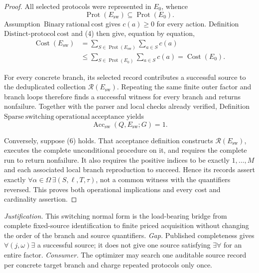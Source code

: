 \documentclass{article}
\begin{document}
\begin{proof}
All selected protocols were represented in \(E_0\), whence
\[
 \operatorname{Prot}(E_{\mathrm{sw}})
 \subseteq \operatorname{Prot}(E_0).
 \tag{4}
\]
Assumption~\(\mathrm{Binary\ rational\ cost}\) gives \(c(a)\geq0\) for every action.  Definition~\(\mathrm{Distinct\mbox{-}protocol\ cost}\) and (4) then give, equation by equation,
\[
\begin{aligned}
 \operatorname{Cost}(E_{\mathrm{sw}})
 &=\sum_{S\in\operatorname{Prot}(E_{\mathrm{sw}})}\sum_{a\in S}c(a)\\
 &\leq \sum_{S\in\operatorname{Prot}(E_0)}\sum_{a\in S}c(a)
 =\operatorname{Cost}(E_0).
\end{aligned}
\tag{5}
\]

For every concrete branch, its selected record contributes a successful source to the deduplicated collection \(\mathcal R(E_{\mathrm{sw}})\).  Repeating the same finite outer factor and branch loops therefore finds a successful witness for every branch and returns nonfailure.  Together with the parser and local checks already verified, Definition~\(\mathrm{Sparse\ switching\ operational\ acceptance}\) yields
\[
 \operatorname{Acc}_{\mathrm{sw}}(Q,E_{\mathrm{sw}};G)=1.
 \tag{6}
\]

Conversely, suppose (6) holds.  That acceptance definition constructs \(\mathcal R(E_{\mathrm{sw}})\), executes the complete unconditional procedure on it, and requires the complete run to return nonfailure.  It also requires the positive indices to be exactly \(1,\ldots,M\) and each associated local branch reproduction to succeed.  Hence its records assert exactly
\(\forall\alpha\in\Omega\,\exists(S,\ell,T,\tau)\), not a common witness with the quantifiers reversed.  This proves both operational implications and every cost and cardinality assertion.
\end{proof}
\par\smallskip\noindent \textit{Justification.} This switching normal form is the load-bearing bridge from complete fixed-source identification to finite priced acquisition without changing the order of the branch and source quantifiers. \textit{Gap.} Published completeness gives \(\forall(j,\omega)\exists\) a successful source; it does not give one source satisfying \(\exists\forall\) for an entire factor. \textit{Consumer.} The optimizer may search one auditable source record per concrete target branch and charge repeated protocols only once.
\end{document}
